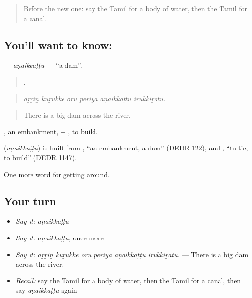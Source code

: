 \label{lesson:TA-C432-anaikkattu}



\begin{quote}
Before the new one: say the Tamil for a body of water, then the Tamil for a canal.
\end{quote}

\subsection*{You'll want to know: }
\textbf{} — \emph{aṇaikkaṭṭu} — \textquotedblleft{}a dam\textquotedblright{}.

\begin{quote}
     .
\end{quote}

\begin{quote}
\emph{āṟṟiṉ kuṟukkē oru periya aṇaikkaṭṭu irukkiṟatu.}
\end{quote}

\begin{quote}
There is a big dam across the river.
\end{quote}

, an embankment, + , to build.

\begin{cousinweb}
\textbf{} (\emph{aṇaikkaṭṭu}) is built from , \textquotedblleft{}an embankment, a dam\textquotedblright{} (DEDR 122), and , \textquotedblleft{}to tie, to build\textquotedblright{} (DEDR 1147).
\end{cousinweb}

\begin{grammarlens}[title={What you've built}]
One more word for getting around.
\end{grammarlens}

\subsection*{Your turn}
\begin{itemize}
\raggedright
  \item \emph{Say it:} \emph{aṇaikkaṭṭu}
  \item \emph{Say it:} \emph{aṇaikkaṭṭu}, once more
  \item \emph{Say it:} \emph{āṟṟiṉ kuṟukkē oru periya aṇaikkaṭṭu irukkiṟatu.} — There is a big dam across the river.
  \item \emph{Recall:} say the Tamil for a body of water, then the Tamil for a canal, then say \emph{aṇaikkaṭṭu} again
\end{itemize}

